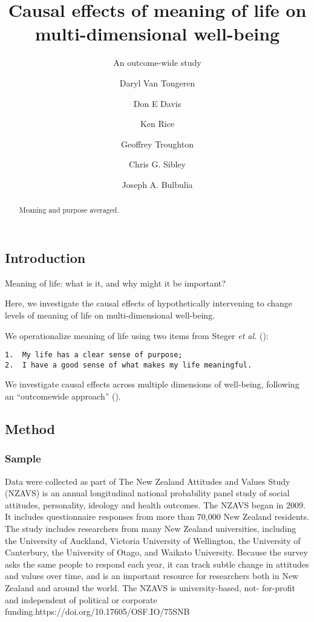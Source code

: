 \documentclass[
  singlecolumn,
  9pt]{scrartcl}
\title{Causal effects of meaning of life on multi-dimensional
well-being}
\subtitle{An outcome-wide study}
\author{Daryl Van Tongeren}
\affil{%
                  Hope College
              }
\author{Don E Davis}
\affil{%
                  Georgia State University
              }
\author{Ken Rice}
\affil{%
                  Georgia State University
              }
\author{Geoffrey Troughton}
\affil{%
                  Victoria University of Wellington
              }
\author{Chris G. Sibley}
\affil{%
                  School of Psychology, University of Auckland
              }
\author{Joseph A. Bulbulia}
\affil{%
                  Victoria University of Wellington, New Zealand
              }
\date{}
\begin{document}
\maketitle
\begin{abstract}
Meaning and purpose averaged.
\end{abstract}

\listoffigures
\listoftables
\subsection{Introduction}\label{introduction}

Meaning of life: what is it, and why might it be important?

Here, we investigate the causal effects of hypothetically intervening to
change levels of meaning of life on multi-dimensional well-being.

We operationalize meaning of life using two items from Steger \emph{et
al.} ():

\begin{verbatim}
1.  My life has a clear sense of purpose;
2.  I have a good sense of what makes my life meaningful.
\end{verbatim}

We investigate causal effects across multiple dimensions of well-being,
following an ``outcomewide approach''
().

\subsection{Method}\label{method}

\subsubsection{Sample}\label{sample}

Data were collected as part of The New Zealand Attitudes and Values
Study (NZAVS) is an annual longitudinal national probability panel study
of social attitudes, personality, ideology and health outcomes. The
NZAVS began in 2009. It includes questionnaire responses from more than
70,000 New Zealand residents. The study includes researchers from many
New Zealand universities, including the University of Auckland, Victoria
University of Wellington, the University of Canterbury, the University
of Otago, and Waikato University. Because the survey asks the same
people to respond each year, it can track subtle change in attitudes and
values over time, and is an important resource for researchers both in
New Zealand and around the world. The NZAVS is university-based, not-
for-profit and independent of political or corporate
funding.https://doi.org/10.17605/OSF.IO/75SNB
\end{document}
